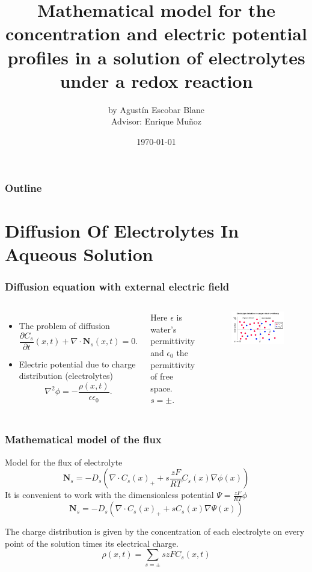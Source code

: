 \documentclass{beamer}
\title{\Large Mathematical model for the concentration and electric potential profiles in a solution of electrolytes under a redox reaction}
\author{by Agust\'in Escobar Blanc \\ Advisor: Enrique Mu\~noz}
\institute{Pontificia Universidad Cat\'olica de Chile\\ Instituto de F\'isica}
\date{\today}
\begin{document}
\begin{frame}
\titlepage
\end{frame}

\begin{frame}
\frametitle{Outline}
\tableofcontents
\end{frame}

\section{Diffusion Of Electrolytes In Aqueous Solution }


\begin{frame}
\frametitle{Diffusion equation with external electric field}
\begin{columns}
	\begin{itemize}
	\item The problem of diffusion
			$$\frac{\partial C_s}{\partial t}(x,t) +\nabla \cdot \mathbf{N}_s(x,t) = 0.$$
	\item Electric potential due to charge distribution (electrolytes)
			$$\nabla^2\phi = - \frac{\rho(x,t)}{\epsilon \epsilon_0}.$$
	\end{itemize}
	Here	$\epsilon$ is water's permittivity and $\epsilon_0$ the permittivity of free space. $s = \pm$.

	\begin{figure}
	\includegraphics[width=\textwidth]{geometry.png}
	\caption{}
	\end{figure}
\end{columns}

\end{frame}

\begin{frame}
\frametitle{Mathematical model of the flux}
Model for the flux of electrolyte
$$\mathbf{N}_s= -D_s\left(\nabla\cdot C_s(x)_+ +s\frac{z F}{RT}C_s(x)\nabla\phi(x)\right)$$
 It is convenient to work with the dimensionless potential $\Psi = \frac{zF}{RT}\phi$
$$\mathbf{N}_s= -D_s\left(\nabla\cdot C_s(x)_+ +sC_s(x)\nabla\Psi(x)\right)$$

The charge distribution is given by the concentration of each electrolyte on every point of the solution times its electrical charge.
$$\rho(x,t) = \sum_{s = \pm} szFC_s(x,t)$$
\end{frame}
\end{document}
